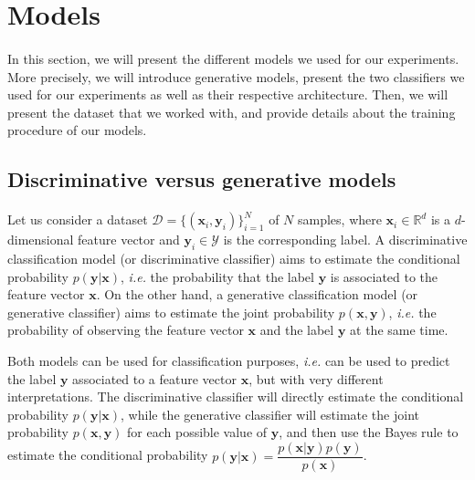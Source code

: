 \documentclass[11pt,twocolumn,letterpaper]{article}
\begin{document}
\section{Models}
\label{sec:models}

\paragraph{} In this section, we will present the different models we used for our experiments. More precisely, we will introduce generative models, present the two classifiers we used for our experiments as well as their respective architecture. Then, we will present the dataset that we worked with, and provide details about the training procedure of our models.

\subsection{Discriminative versus generative models}

\paragraph{} Let us consider a dataset $\mathcal{D} = \{(\bm{x}_i, \bm{y}_i)\}_{i=1}^N$ of $N$ samples, where $\bm{x}_i \in \mathbb{R}^d$ is a $d$-dimensional feature vector and $\bm{y}_i \in \mathcal{Y}$ is the corresponding label. A discriminative classification model (or discriminative classifier) aims to estimate the conditional probability $p(\bm{y}|\bm{x})$, \textit{i.e.} the probability that the label $\bm{y}$ is associated to the feature vector $\bm{x}$. On the other hand, a generative classification model (or generative classifier) aims to estimate the joint probability $p(\bm{x}, \bm{y})$, \textit{i.e.} the probability of observing the feature vector $\bm{x}$ and the label $\bm{y}$ at the same time. 

Both models can be used for classification purposes, \textit{i.e.} can be used to predict the label $\bm{y}$ associated to a feature vector $\bm{x}$, but with very different interpretations. The discriminative classifier will directly estimate the conditional probability $p(\bm{y}|\bm{x})$, while the generative classifier will estimate the joint probability $p(\bm{x}, \bm{y})$ for each possible value of $\bm{y}$, and then use the Bayes rule to estimate the conditional probability $p(\bm{y}|\bm{x}) = \dfrac{p(\bm{x}|\bm{y})p(\bm{y})}{p(\bm{x})}$.
\end{document}
